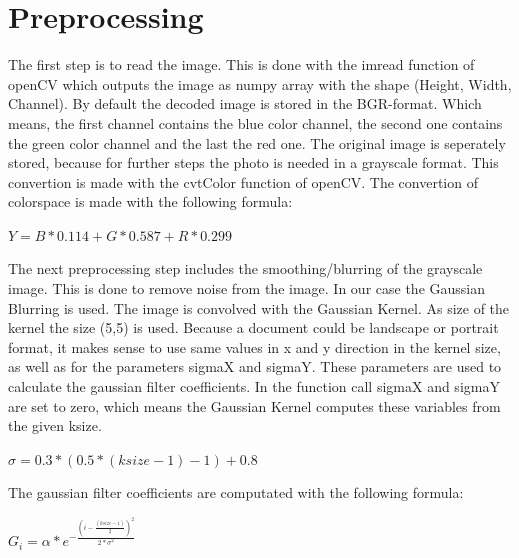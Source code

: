 \documentclass[twocolumn,10pt]{asme2ej}
\begin{document}
\section{Preprocessing}
\label{section:preprocessing}

The first step is to read the image. This is done with the imread function of openCV which 
outputs the image as numpy array with the shape (Height, Width, Channel).
By default the decoded image is stored in the BGR-format. Which means, the first channel contains the
blue color channel, the second one contains the green color channel and the last the red one.
The original image is seperately stored, because for further steps the photo is needed in a grayscale format.
This convertion is made with the cvtColor\cite{opencv_cvtColor} function of openCV. The convertion of colorspace is made with the following
formula\cite{opencv_rgb2gray}:
\begin{center}
    $Y = B * 0.114 + G * 0.587 + R * 0.299$
    \label{eq_rgb2gray}
\end{center}
The next preprocessing step includes the smoothing/blurring of the grayscale image.
This is done to remove noise from the image\cite{opencv_smoothingimages}. In our case
the Gaussian Blurring\cite{opencv_gaussianblur} is used. The image is convolved with the Gaussian Kernel.
As size of the kernel the size (5,5) is used. Because a document could be landscape or portrait format, 
it makes sense to use same values in x and y direction in the kernel size, as well as for the parameters
sigmaX and sigmaY. These parameters are used to calculate the gaussian filter coefficients. In the function call
sigmaX and sigmaY are set to zero, which means the Gaussian Kernel computes these variables from the given
ksize\cite{opencv_getgaussiankernel}.
\begin{center}
    $\sigma = 0.3 * (0.5 * (ksize - 1 ) - 1) + 0.8$
    \label{eq_sigma}
\end{center}
The gaussian filter coefficients are computated with the following formula\cite{opencv_getgaussiankernel}:
\begin{center}
    $G_i = \alpha * e^{- \frac{(i - \frac{(ksize - 1)}{2})^2}{2*\sigma^2 } }$
    \label{eq_sigma}
\end{center}

\end{document}
